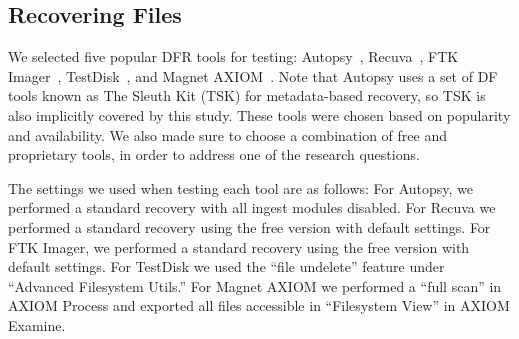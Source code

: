 
\subsection{Recovering Files}

We selected five popular DFR tools for testing: Autopsy~\cite{autopsy}, Recuva~\cite{recuva}, FTK Imager~\cite{ftk}, TestDisk~\cite{testdisk}, and Magnet AXIOM~\cite{axiom}. 
Note that Autopsy uses a set of DF tools known as The Sleuth Kit (TSK) for metadata-based recovery, so TSK is also implicitly covered by this study. 
These tools were chosen based on popularity and availability.
We also made sure to choose a combination of free and proprietary tools, in order to address one of the research questions.

The settings we used when testing each tool are as follows:
For Autopsy, we performed a standard recovery with all ingest modules disabled.
For Recuva we performed a standard recovery using the free version with default settings.
For FTK Imager, we performed a standard recovery using the free version with default settings.
For TestDisk we used the ``file undelete'' feature under ``Advanced Filesystem Utils.''
For Magnet AXIOM we performed a ``full scan'' in AXIOM Process and exported all files accessible in ``Filesystem View'' in AXIOM Examine.

